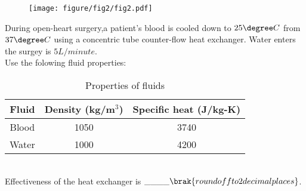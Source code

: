 \begin{figure}[h!]
         \centering
        \texttt{[image: figure/fig2/fig2.pdf]}
		\caption{}
        \label{stemplot}

\end{figure}

     \item During open-heart surgery,a patient's blood is cooled down to $25\degree C$ from $37\degree C$ using a concentric tube counter-flow heat exchanger. Water enters the surgey is $5 L/minute$.\\
     Use the folowing fluid properties:\\
\begin{table}[h!]
\centering
\begin{tabular}{|c|c|c|}
\hline
\textbf{Fluid} & \textbf{Density (kg/m$^3$)} & \textbf{Specific heat (J/kg-K)} \\
\hline
Blood & 1050 & 3740 \\
\hline
Water & 1000 & 4200 \\
\hline
\end{tabular}
\caption{Properties of fluids}
\end{table}\\
     Effectiveness of the heat exchanger is $\_\_\_\_ \brak{round off to 2 decimal places}$.





     
 

